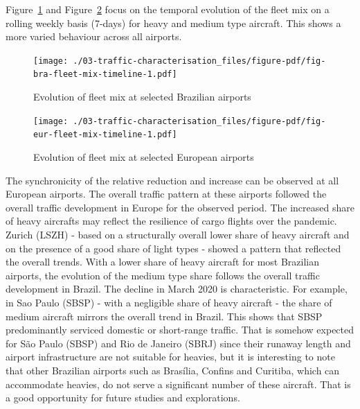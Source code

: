 \documentclass[
  a4paper,
  DIV=11,
  numbers=noendperiod]{scrreprt}
\begin{document}
Figure~\ref{fig-bra-fleet-mix-timeline} and
Figure~\ref{fig-eur-fleet-mix-timeline} focus on the temporal evolution
of the fleet mix on a rolling weekly basis (7-days) for heavy and medium
type aircraft. This shows a more varied behaviour across all airports.

\begin{figure}[h]

{\centering \texttt{[image: ./03-traffic-characterisation\_files/figure-pdf/fig-bra-fleet-mix-timeline-1.pdf]}

}

\caption{\label{fig-bra-fleet-mix-timeline}Evolution of fleet mix at
selected Brazilian airports}

\end{figure}

\begin{figure}[h]

{\centering \texttt{[image: ./03-traffic-characterisation\_files/figure-pdf/fig-eur-fleet-mix-timeline-1.pdf]}

}

\caption{\label{fig-eur-fleet-mix-timeline}Evolution of fleet mix at
selected European airports}

\end{figure}

The synchronicity of the relative reduction and increase can be observed
at all European airports. The overall traffic pattern at these airports
followed the overall traffic development in Europe for the observed
period. The increased share of heavy aircrafts may reflect the
resilience of cargo flights over the pandemic. Zurich (LSZH) - based on
a structurally overall lower share of heavy aircraft and on the presence
of a good share of light types - showed a pattern that reflected the
overall trends. With a lower share of heavy aircraft for most Brazilian
airports, the evolution of the medium type share follows the overall
traffic development in Brazil. The decline in March 2020 is
characteristic. For example, in Sao Paulo (SBSP) - with a negligible
share of heavy aircraft - the share of medium aircraft mirrors the
overall trend in Brazil. This shows that SBSP predominantly serviced
domestic or short-range traffic. That is somehow expected for São Paulo
(SBSP) and Rio de Janeiro (SBRJ) since their runaway length and airport
infrastructure are not suitable for heavies, but it is interesting to
note that other Brazilian airports such as Brasília, Confins and
Curitiba, which can accommodate heavies, do not serve a significant
number of these aircraft. That is a good opportunity for future studies
and explorations.
\end{document}
